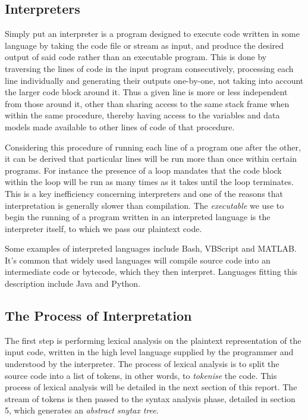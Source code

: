 \documentclass[a4paper, 11pt]{article}
\begin{document}
\subsection{Interpreters}
Simply put an interpreter is a program designed to execute code written in some language by taking the code file or stream as input, and produce the desired output of said code rather than an executable program. This is done by traversing the lines of code in the input program consecutively, processing each line individually and generating their outputs one-by-one, not taking into account the larger code block around it. Thus a given line is more or less independent from those around it, other than sharing access to the same stack frame when within the same procedure, thereby having access to the variables and data models made available to other lines of code of that procedure.

Considering this procedure of running each line of a program one after the other, it can be derived that particular lines will be run more than once within certain programs. For instance the presence of a loop mandates that the code block within the loop will be run as many times as it takes until the loop terminates. This is a key inefficiency concerning interpreters and one of the reasons that interpretation is generally slower than compilation. The \textit{executable} we use to begin the running of a program written in an interpreted language is the interpreter itself, to which we pass our plaintext code.

Some examples of interpreted languages include Bash, VBScript and MATLAB. It's common that widely used languages will compile source code into an intermediate code or bytecode, which they then interpret. Languages fitting this description include Java and Python.

\subsection{The Process of Interpretation}
The first step is performing lexical analysis on the plaintext representation of the input code, written in the high level language supplied by the programmer and understood by the interpreter. The process of lexical analysis is to split the source code into a list of tokens, in other words, to \textit{tokenise} the code. This process of lexical analysis will be detailed in the next section of this report. The stream of tokens is then passed to the syntax analysis phase, detailed in section 5, which generates an \textit{abstract snytax tree}.
\end{document}
